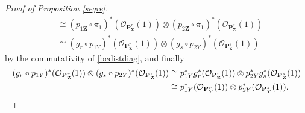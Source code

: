 \documentclass[10pt]{article}
\theoremstyle{definition}
\theoremstyle{remark}
\numberwithin{equation}{section}
\numberwithin{figure}{subsubsection}
\newcommand{\OO}{\mathcal{O}}
\begin{document}
\begin{proof}[Proof of Proposition \ref{segre}]
\begin{align*}
    &\cong (p_{1\mathbf{Z}}\circ\pi_1)^*(\OO_{\mathbf{P}_\mathbf{Z}^r}(1)) \otimes (p_{2\mathbf{Z}}\circ\pi_1)^*(\OO_{\mathbf{P}_\mathbf{Z}^s}(1))\\
    &\cong (g_r \circ p_{1Y})^*(\OO_{\mathbf{P}_\mathbf{Z}^r}(1)) \otimes (g_s \circ p_{2Y})^*(\OO_{\mathbf{P}_\mathbf{Z}^s}(1))
  \end{align*}
  by the commutativity of \eqref{bcdistdiag}, and finally
  \begin{align*}
    (g_r \circ p_{1Y})^*(\OO_{\mathbf{P}_\mathbf{Z}^r}(1)) \otimes (g_s \circ p_{2Y})^*(\OO_{\mathbf{P}_\mathbf{Z}^s}(1)) &\cong p_{1Y}^*g_r^*(\OO_{\mathbf{P}_\mathbf{Z}^r}(1)) \otimes p_{2Y}^*g_s^*(\OO_{\mathbf{P}_\mathbf{Z}^s}(1))\\
    &\cong p_{1Y}^*(\OO_{\mathbf{P}_Y^r}(1)) \otimes p_{2Y}^*(\OO_{\mathbf{P}_Y^s}(1)).\qedhere
  \end{align*}
\end{proof}
\end{document}
